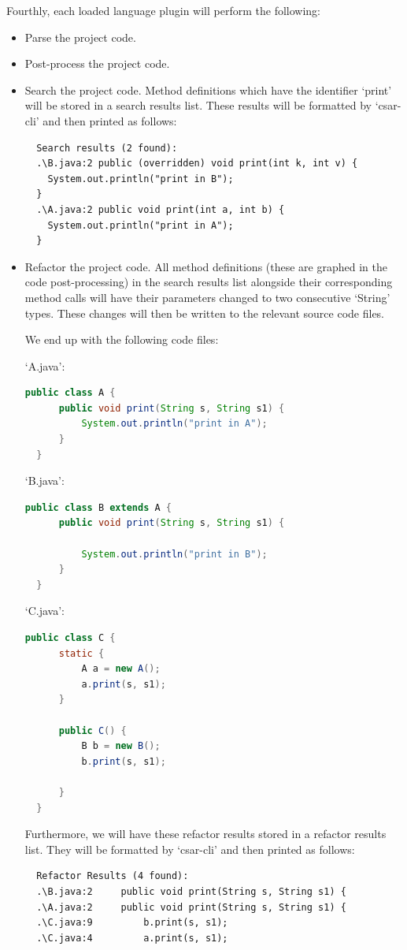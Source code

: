 \documentclass[12pt, letterpaper]{article}
\begin{document}
Fourthly, each loaded language plugin will perform the following:
\begin{itemize}
  \item Parse the project code.
  \item Post-process the project code.
  \item Search the project code.
  Method definitions which have the identifier `print' will be stored in a search results list.
  These results will be formatted  by `csar-cli' and then printed as follows:
  \begin{lstlisting}
  Search results (2 found):
  .\B.java:2 public (overridden) void print(int k, int v) {
    System.out.println("print in B");
  }
  .\A.java:2 public void print(int a, int b) {
    System.out.println("print in A");
  }
  \end{lstlisting}
  \item Refactor the project code.
  All method definitions (these are graphed in the code post-processing) in the search results list alongside their corresponding method calls will have their parameters changed to two consecutive `String' types.
  These changes will then be written to the relevant source code files.
  
  We end up with the following code files:

  `A.java':
  \begin{lstlisting}[language=Java]
  public class A {
      public void print(String s, String s1) {
          System.out.println("print in A");
      }
  }
  \end{lstlisting}

  `B.java':
  \begin{lstlisting}[language=Java]
  public class B extends A {
      public void print(String s, String s1) {

          System.out.println("print in B");
      }
  }
  \end{lstlisting}

  `C.java':
  \begin{lstlisting}[language=Java]
  public class C {
      static {
          A a = new A();
          a.print(s, s1);
      }
      
      public C() {
          B b = new B();
          b.print(s, s1);

      }
  }
  \end{lstlisting}
  
  Furthermore, we will have these refactor results stored in a refactor results list.
  They will be formatted by `csar-cli' and then printed as follows:
  \begin{lstlisting}
  Refactor Results (4 found):
  .\B.java:2     public void print(String s, String s1) {
  .\A.java:2     public void print(String s, String s1) {
  .\C.java:9         b.print(s, s1);
  .\C.java:4         a.print(s, s1);
  \end{lstlisting}
\end{itemize}
\end{document}
